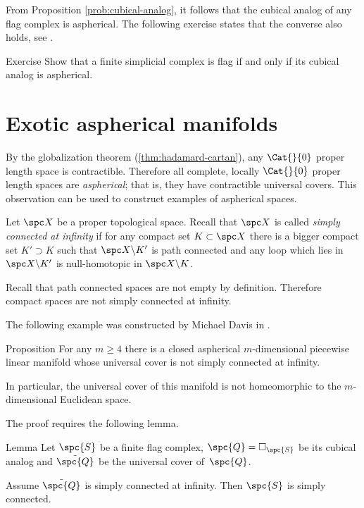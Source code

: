 From Proposition \ref{prob:cubical-analog}, 
it follows that the cubical analog
of any flag complex is aspherical.
The following exercise states that the  converse also holds, see \cite[5.4]{davis-survey}.

\begin{thm}{Exercise}\label{ex:flag-aspherical}
Show that a finite simplicial complex is flag 
if and only if its cubical analog is aspherical.
\end{thm}

\section{Exotic aspherical manifolds}


By the globalization theorem (\ref{thm:hadamard-cartan}),
any $\Cat{}{0}$ proper length space is contractible.
Therefore all complete, locally $\Cat{}{0}$ proper length spaces 
are \emph{aspherical};
that is, they have contractible universal covers.
This observation can be used to construct examples of aspherical spaces. 

Let $\spc X$ be a proper topological space.
Recall that $\spc X$ is called 
\emph{simply connected at infinity} 
if for any compact set $K\subset\spc X$
there is a bigger compact set $K'\supset K$
such that  $\spc X\backslash K'$ is path connected 
and any loop which lies in $\spc X\backslash K'$
is null-homotopic in  $\spc X\backslash K$.

Recall that path connected spaces are not empty by definition.
Therefore compact spaces are not simply connected at infinity.

The following example was constructed by Michael 
Davis in \cite{davis-noneuclidean}.

\begin{thm}{Proposition}\label{prop:aspherical}
For any  $m\ge 4$ there is a closed aspherical 
$m$-dimensional piecewise linear manifold
whose universal cover is not simply connected at infinity.

In particular, the universal cover of this manifold 
is not homeomorphic to the $m$-dimensional Euclidean space.
\end{thm}

The proof requires the following lemma.

\begin{thm}{Lemma}\label{lem:example-pi_infty}
Let $\spc{S}$ be a finite flag complex,
$\spc{Q}=\square_{\spc{S}}$ be its cubical analog
and $\tilde{\spc{Q}}$ be the universal cover of~$\spc{Q}$.

Assume  $\tilde{\spc{Q}}$ is simply connected at infinity.
Then $\spc{S}$ is simply connected.
\end{thm}

